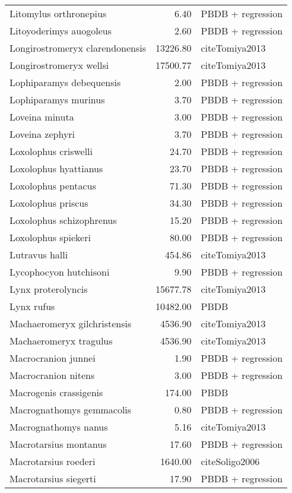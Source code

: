 \begin{table}[ht]
\begin{tabular}{lrl}
  Litomylus orthronepius & 6.40 & PBDB + regression \\ 
  Litoyoderimys auogoleus & 2.60 & PBDB + regression \\ 
  Longirostromeryx clarendonensis & 13226.80 & cite{Tomiya2013} \\ 
  Longirostromeryx wellsi & 17500.77 & cite{Tomiya2013} \\ 
  Lophiparamys debequensis & 2.00 & PBDB + regression \\ 
  Lophiparamys murinus & 3.70 & PBDB + regression \\ 
  Loveina minuta & 3.00 & PBDB + regression \\ 
  Loveina zephyri & 3.70 & PBDB + regression \\ 
  Loxolophus criswelli & 24.70 & PBDB + regression \\ 
  Loxolophus hyattianus & 23.70 & PBDB + regression \\ 
  Loxolophus pentacus & 71.30 & PBDB + regression \\ 
  Loxolophus priscus & 34.30 & PBDB + regression \\ 
  Loxolophus schizophrenus & 15.20 & PBDB + regression \\ 
  Loxolophus spiekeri & 80.00 & PBDB + regression \\ 
  Lutravus halli & 454.86 & cite{Tomiya2013} \\ 
  Lycophocyon hutchisoni & 9.90 & PBDB + regression \\ 
  Lynx proterolyncis & 15677.78 & cite{Tomiya2013} \\ 
  Lynx rufus & 10482.00 & PBDB \\ 
  Machaeromeryx gilchristensis & 4536.90 & cite{Tomiya2013} \\ 
  Machaeromeryx tragulus & 4536.90 & cite{Tomiya2013} \\ 
  Macrocranion junnei & 1.90 & PBDB + regression \\ 
  Macrocranion nitens & 3.00 & PBDB + regression \\ 
  Macrogenis crassigenis & 174.00 & PBDB \\ 
  Macrognathomys gemmacolis & 0.80 & PBDB + regression \\ 
  Macrognathomys nanus & 5.16 & cite{Tomiya2013} \\ 
  Macrotarsius montanus & 17.60 & PBDB + regression \\ 
  Macrotarsius roederi & 1640.00 & cite{Soligo2006} \\ 
  Macrotarsius siegerti & 17.90 & PBDB + regression \\ 

\end{tabular}
\end{table}
